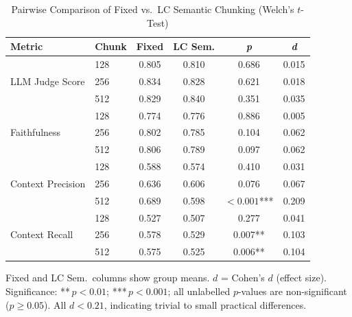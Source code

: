
\begin{table}[!t]
  \caption{Pairwise Comparison of Fixed vs.\ LC Semantic Chunking (Welch's $t$-Test)}
  \label{tab:fixed_vs_lc}
  \centering
  \renewcommand{\arraystretch}{1.2}
  \begin{tabular}{llcccc}
    \hline
    \textbf{Metric} & \textbf{Chunk} & \textbf{Fixed} & \textbf{LC Sem.} & \textbf{\textit{p}} & \textbf{\textit{d}} \\
    \hline
    \multirow{3}{*}{LLM Judge Score}
      & 128 & 0.805 & 0.810 & 0.686 & 0.015 \\
      & 256 & 0.834 & 0.828 & 0.621 & 0.018 \\
      & 512 & 0.829 & 0.840 & 0.351 & 0.035 \\
    \hline
    \multirow{3}{*}{Faithfulness}
      & 128 & 0.774 & 0.776 & 0.886 & 0.005 \\
      & 256 & 0.802 & 0.785 & 0.104 & 0.062 \\
      & 512 & 0.806 & 0.789 & 0.097 & 0.062 \\
    \hline
    \multirow{3}{*}{Context Precision}
      & 128 & 0.588 & 0.574 & 0.410 & 0.031 \\
      & 256 & 0.636 & 0.606 & 0.076 & 0.067 \\
      & 512 & 0.689 & 0.598 & $< 0.001$*** & 0.209 \\
    \hline
    \multirow{3}{*}{Context Recall}
      & 128 & 0.527 & 0.507 & 0.277 & 0.041 \\
      & 256 & 0.578 & 0.529 & $0.007$** & 0.103 \\
      & 512 & 0.575 & 0.525 & $0.006$** & 0.104 \\
    \hline
  \end{tabular}
  \begin{tablenotes}
    \small
    \item Fixed and LC Sem.\ columns show group means. $d$ = Cohen's $d$ (effect size).
    Significance: **\,$p < 0.01$; ***\,$p < 0.001$; all unlabelled $p$-values are non-significant ($p \geq 0.05$).
    All $d < 0.21$, indicating trivial to small practical differences.
  \end{tablenotes}
\end{table}
